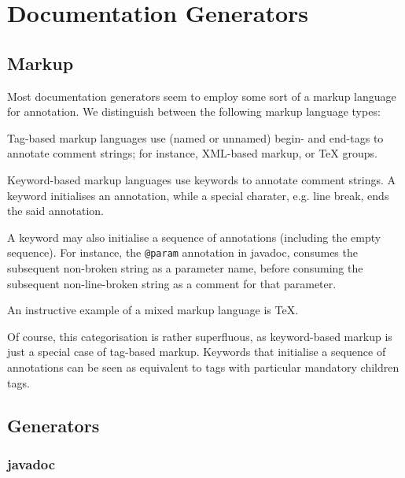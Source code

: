 \section{Documentation Generators}

\subsection{Markup}

Most documentation generators seem to employ some sort of a markup language for
annotation. We distinguish between the following markup language types:

\begin{description}[\setleftmargin{90pt}\setlabelstyle{\bf}]

\item [Tag] Tag-based markup languages use (named or unnamed) begin- and
end-tags to annotate comment strings; for instance, XML-based markup, or \TeX{}
groups.

\item [Keyword] Keyword-based markup languages use keywords to annotate comment
strings. A keyword initialises an annotation, while a special charater, e.g.
line break, ends the said annotation.

A keyword may also initialise a sequence of annotations (including the empty
sequence). For instance, the \texttt{@param} annotation in javadoc, consumes
the subsequent non-broken string as a parameter name, before consuming the
subsequent non-line-broken string as a comment for that parameter.

\item [Mixed] An instructive example of a mixed markup language is \TeX{}.

\end{description}

Of course, this categorisation is rather superfluous, as keyword-based markup
is just a special case of tag-based markup. Keywords that initialise a sequence
of annotations can be seen as equivalent to tags with particular mandatory
children tags.

\subsection{Generators}

\subsubsection{javadoc}

